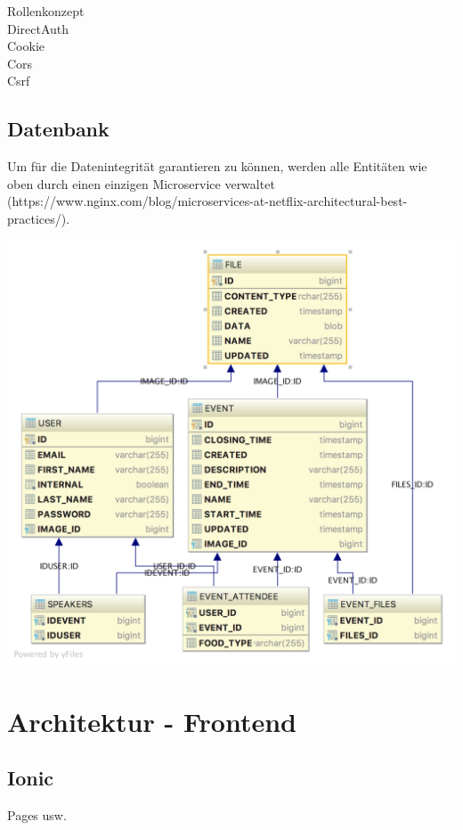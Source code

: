 \documentclass[11pt]{article} %
\begin{document}
Rollenkonzept
\\
DirectAuth
\\
Cookie
\\
Cors
\\
Csrf

\newpage
\subsection{Datenbank}
Um für die Datenintegrität garantieren zu können, werden alle Entitäten wie oben durch einen einzigen Microservice verwaltet (https://www.nginx.com/blog/microservices-at-netflix-architectural-best-practices/).

\includegraphics[width=1\textwidth]{dbSchema}
\newpage
\section{Architektur - Frontend}
\subsection{Ionic}
Pages usw.




\newpage
\end{document}
